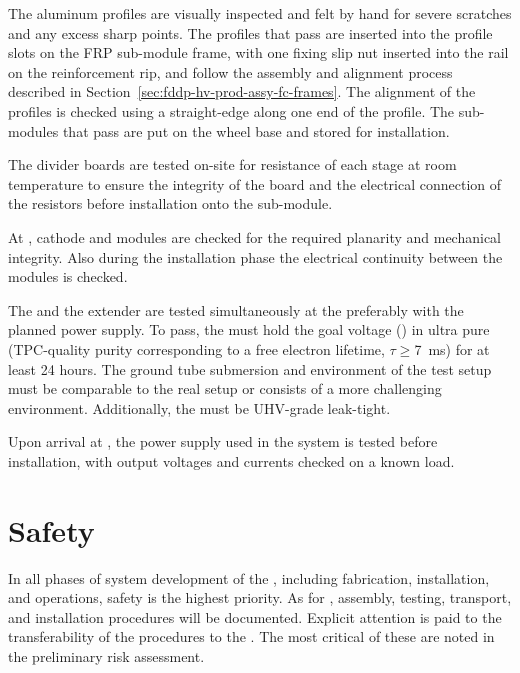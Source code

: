 The aluminum profiles are visually inspected and felt by hand for severe scratches and any excess sharp points.  The profiles that pass are inserted into the profile slots on the FRP sub-module frame, with one fixing slip nut inserted into the rail on the reinforcement rip, 
 and follow the assembly and alignment process described in Section~\ref{sec:fddp-hv-prod-assy-fc-frames}.  The alignment of the profiles is checked using a straight-edge along one end of the profile.  The sub-modules that pass are put on the wheel base and stored for installation.

The  divider boards are tested on-site for resistance of each stage at room temperature to ensure the integrity of the board and the electrical connection of the resistors before installation onto the sub-module. 

At \surf, cathode and  modules are checked for the required planarity and mechanical integrity. Also during the installation phase  the electrical continuity between the modules is checked.

The \fdth and the  extender are tested simultaneously at the  
preferably with the planned %
power supply. To pass, the \fdth must hold the goal voltage (\dptargetdriftvoltneg{}) in ultra pure \lar (TPC-quality purity corresponding to a free electron lifetime, $\tau\geq$\SI{7}{\ms}) for at least \num{24} hours. The ground tube submersion and \efield environment of the test setup must be comparable to the real  setup or consists of a more challenging environment. Additionally, the \fdth must be UHV-grade leak-tight.

Upon arrival at \surf, the power supply used in the   system is tested before installation, with  output voltages and currents checked on a known load. 

\noindent 
\section{Safety}
In all phases of  system development of the \dpmod, including fabrication, installation, and operations, safety is the highest priority.  As for , assembly, testing, transport, and installation procedures will be documented. Explicit attention is paid to the transferability of the  procedures to the \dpmod. The most critical of these are noted in the preliminary  risk assessment. 

